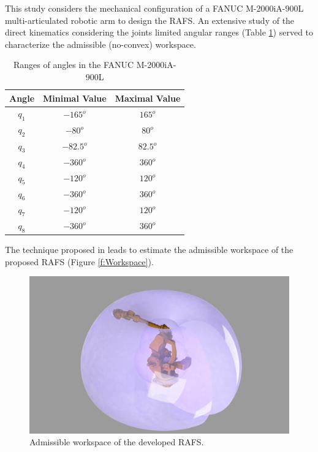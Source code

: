 \documentclass[journal,twocolumn]{IEEEtran}
\begin{document}
This study considers the mechanical configuration of a FANUC M-2000iA-900L multi-articulated robotic arm to design the RAFS. An extensive study of the direct kinematics considering the joints limited angular ranges (Table \ref{tab:TableAngMov}) served to characterize the admissible (no-convex) workspace. 
%
\begin{table}[!h]
    \centering
    \caption{Ranges of angles in the FANUC M-2000iA-900L}
    \begin{tabular}{c|c|c}
         Angle & Minimal Value & Maximal Value \\
         \hline
         \hline 
         $q_{1}$ & $-165 ^{o}$ & $165 ^{o}$ \\
         $q_{2}$ & $-80 ^{o}$ & $80 ^{o}$ \\
         $q_{3}$ & $-82.5 ^{o}$ & $82.5 ^{o}$ \\
         $q_{4}$ & $-360 ^{o}$ & $360 ^{o}$ \\
         $q_{5}$ & $-120 ^{o}$ & $120 ^{o}$ \\
         $q_{6}$ & $-360 ^{o}$ & $360 ^{o}$ \\
         $q_{7}$ & $-120 ^{o}$ & $120 ^{o}$ \\
         $q_{8}$ & $-360 ^{o}$ & $360 ^{o}$ \\
         \hline
         \hline
    \end{tabular}
    \label{tab:TableAngMov}
\end{table}

The technique proposed in \cite{SSS} leads to estimate the admissible workspace of the proposed RAFS (Figure \ref{f:Workspace}). 

\begin{figure}
    \centering
    \includegraphics[scale=0.3]{Figures/Rango.JPG}
    \caption{Admissible workspace of the developed RAFS.}
    \label{fig:RoboticArmConf}
\end{figure}
\end{document}

